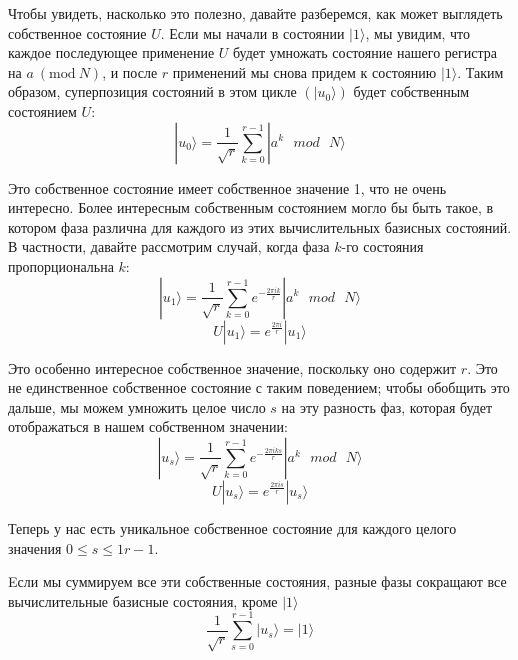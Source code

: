 \documentclass[14pt]{article}
\newcommand{\Mod}[1]{\ (\mathrm{mod}\ #1)}
\begin{document}
	Чтобы увидеть, насколько это полезно, давайте разберемся, как может выглядеть собственное состояние $U$. Если мы начали в состоянии $|1 \rangle$, мы увидим, что каждое последующее применение $U$ будет умножать состояние нашего регистра на $a \Mod{N}$, и после $r$ применений мы снова придем к состоянию $|1 \rangle$. Таким образом, суперпозиция состояний в этом цикле $(|u_0 \rangle)$ будет собственным состоянием $U$:
	\begin{equation}
		|u_0 \rangle = \frac{1}{\sqrt{r}} \sum_{k=0}^{r-1} |a^k \text{ } mod \text{ } N \rangle
	\end{equation}
	
	Это собственное состояние имеет собственное значение 1, что не очень интересно. Более интересным собственным состоянием могло бы быть такое, в котором фаза различна для каждого из этих вычислительных базисных состояний. В частности, давайте рассмотрим случай, когда фаза $k$-го состояния пропорциональна $k$:
	 \begin{equation}
		|u_1 \rangle = \frac{1}{\sqrt{r}} \sum_{k=0}^{r-1} e^{-\frac{2 \pi i k}{r}} |a^k \text{ } mod \text{ } N \rangle
	\end{equation}
	\begin{equation}
		U|u_1 \rangle = e^{\frac{2 \pi i}{r}} |u_1 \rangle
	\end{equation}
	
	Это особенно интересное собственное значение, поскольку оно содержит $r$. Это не единственное собственное состояние с таким поведением; чтобы обобщить это дальше, мы можем умножить целое число $s$ на эту разность фаз, которая будет отображаться в нашем собственном значении: 
	 \begin{equation}
		|u_s \rangle = \frac{1}{\sqrt{r}} \sum_{k=0}^{r-1} e^{-\frac{2 \pi i k s}{r}} |a^k \text{ } mod \text{ } N \rangle
	\end{equation}
	\begin{equation}
		U|u_s \rangle = e^{\frac{2 \pi i s}{r}} |u_s \rangle
	\end{equation}
	
	Теперь у нас есть уникальное собственное состояние для каждого целого значения $0 \le s 
	\le1 r - 1$.
	
	Eсли мы суммируем все эти собственные состояния, разные фазы сокращают все вычислительные базисные состояния, кроме $|1 \rangle$
	\begin{equation}
		 \frac{1}{\sqrt{r}} \sum_{s=0}^{r-1} |u_s \rangle  = |1 \rangle
	\end{equation}
	
\end{document}

